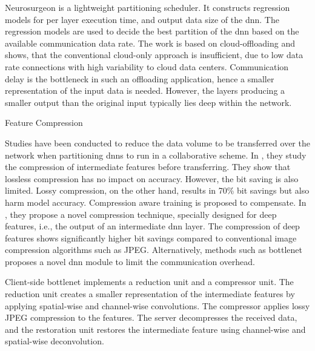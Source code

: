 Neurosurgeon \cite{kang_neurosurgeon:_2017} is a lightweight partitioning scheduler. It constructs regression models for per layer execution time, and output data size of the \gls{dnn}. The regression models are used to decide the best partition of the \gls{dnn} based on the available communication data rate. The work is based on cloud-offloading and shows, that the conventional cloud-only approach is insufficient, due to low data rate connections with high variability to cloud data centers. Communication delay is the bottleneck in such an offloading application, hence a smaller representation of the input data is needed. However, the layers producing a smaller output than the original input typically lies deep within the network.
\begin{enumdescript}
	\item[Feature Compression] 
	
	Studies have been conducted to reduce the data volume to be transferred over the network when partitioning \gls{dnn}s to run in a collaborative scheme.  In \cite{choi_deep_2018}, they study the compression of intermediate features before transferring. They show that lossless compression has no impact on accuracy. However, the bit saving is also limited. Lossy compression, on the other hand, results in 70\% bit savings but also harm model accuracy. Compression aware training is proposed to compensate. In \cite{choi_near-lossless_2018}, they propose a novel compression technique, specially designed for deep features, i.e., the output of an intermediate \gls{dnn} layer. The compression of deep features shows significantly higher bit savings compared to conventional image compression algorithms such as JPEG. Alternatively, methods such as \gls{bottlenet} \cite{eshratifar_bottlenet:_2019}  proposes a novel \gls{dnn} module to limit the communication overhead.
	
	
	
	Client-side \gls{bottlenet} implements a reduction unit and a compressor unit. The reduction unit creates a smaller representation of the intermediate features by applying spatial-wise and channel-wise convolutions. The compressor applies lossy JPEG compression to the features. The server decompresses the received data, and the restoration unit restores the intermediate feature using channel-wise and spatial-wise deconvolution.	
	

\end{enumdescript}
